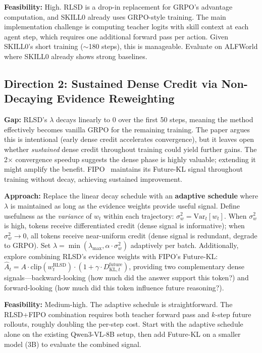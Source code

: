\documentclass[11pt]{article}
\begin{document}
\textbf{Feasibility:} High. RLSD is a drop-in replacement for GRPO's advantage computation, and SKILL0 already uses GRPO-style training. The main implementation challenge is computing teacher logits with skill context at each agent step, which requires one additional forward pass per action. Given SKILL0's short training ($\sim$180 steps), this is manageable. Evaluate on ALFWorld where SKILL0 already shows strong baselines.

\subsection{Direction 2: Sustained Dense Credit via Non-Decaying Evidence Reweighting}

\textbf{Gap:} RLSD's $\lambda$ decays linearly to 0 over the first 50 steps, meaning the method effectively becomes vanilla GRPO for the remaining training. The paper argues this is intentional (early dense credit accelerates convergence), but it leaves open whether \textit{sustained} dense credit throughout training could yield further gains. The 2$\times$ convergence speedup suggests the dense phase is highly valuable; extending it might amplify the benefit. FIPO~\cite{fipo} maintains its Future-KL signal throughout training without decay, achieving sustained improvement.

\textbf{Approach:} Replace the linear decay schedule with an \textbf{adaptive schedule} where $\lambda$ is maintained as long as the evidence weights provide useful signal. Define usefulness as the \textit{variance} of $w_t$ within each trajectory: $\sigma_{w}^{2} = \mathrm{Var}_t[w_t]$. When $\sigma_{w}^{2}$ is high, tokens receive differentiated credit (dense signal is informative); when $\sigma_{w}^{2} \to 0$, all tokens receive near-uniform credit (dense signal is redundant, degrade to GRPO). Set $\lambda = \min(\lambda_{\max}, \alpha \cdot \sigma_{w}^{2})$ adaptively per batch. Additionally, explore combining RLSD's evidence weights with FIPO's Future-KL: $\hat{A}_t = A \cdot \mathrm{clip}(w_{t}^{\mathrm{RLSD}}) \cdot (1 + \gamma \cdot D_{\mathrm{KL},t}^{\mathrm{future}})$, providing two complementary dense signals---backward-looking (how much did the answer support this token?) and forward-looking (how much did this token influence future reasoning?).

\textbf{Feasibility:} Medium-high. The adaptive schedule is straightforward. The RLSD+FIPO combination requires both teacher forward pass and $k$-step future rollouts, roughly doubling the per-step cost. Start with the adaptive schedule alone on the existing Qwen3-VL-8B setup, then add Future-KL on a smaller model (3B) to evaluate the combined signal.
\end{document}
